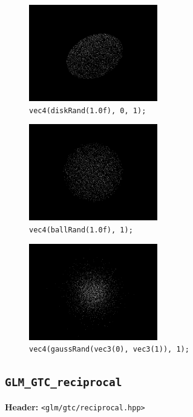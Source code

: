 \documentclass{scrartcl}
\numberwithin{figure}{subsection}
\begin{document}
\begin{figure}[h]
  \centering
  \includegraphics[width=0.5\textwidth]{diskrand}
  \cprotect\caption{\verb|vec4(diskRand(1.0f), 0, 1);|}
\end{figure}

\begin{figure}[h]
  \centering
  \includegraphics[width=0.5\textwidth]{ballrand}
  \cprotect\caption{\verb|vec4(ballRand(1.0f), 1);|}
\end{figure}

\begin{figure}[h]
  \centering
  \includegraphics[width=0.5\textwidth]{gaussrand}
  \cprotect\caption{\verb|vec4(gaussRand(vec3(0), vec3(1)), 1);|}
\end{figure}

\subsection{\texttt{GLM\_GTC\_reciprocal}}
\textbf{Header:} \verb|<glm/gtc/reciprocal.hpp>|
\end{document}
